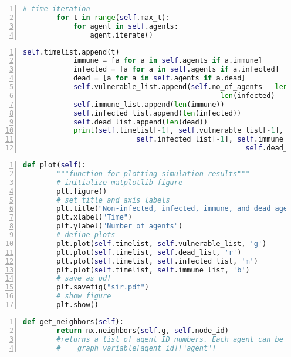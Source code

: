 \documentclass[25pt,a4paper]{article}
\begin{document}
\begin{lstlisting}[language=Python,frame=single,numbers=left,title=Script: Possibility for time iteration (e.g. in a run method of the Simulation class)]
        # time iteration
        for t in range(self.max_t):
            for agent in self.agents:
                agent.iterate()
\end{lstlisting}
\normalsize

\begin{lstlisting}[language=Python,frame=single,numbers=left,title=Script: Possibility for collecting statistics at runtime (requires boolean variables self.immune; self.infected; and self.dead to exist (and be up-to-date) in the Agent class)]
            self.timelist.append(t)
            immune = [a for a in self.agents if a.immune]
            infected = [a for a in self.agents if a.infected]
            dead = [a for a in self.agents if a.dead]
            self.vulnerable_list.append(self.no_of_agents - len(immune) \
                                             - len(infected) - len(dead))
            self.immune_list.append(len(immune))
            self.infected_list.append(len(infected))
            self.dead_list.append(len(dead))
            print(self.timelist[-1], self.vulnerable_list[-1],          \
                           self.infected_list[-1], self.immune_list[-1],\
                                                     self.dead_list[-1],)
\end{lstlisting}
\normalsize

\begin{lstlisting}[language=Python,frame=single,numbers=left,title=Script: Possible plotting method for the Simulation class]
    def plot(self):
        """function for plotting simulation results"""
        # initialize matplotlib figure
        plt.figure()
        # set title and axis labels
        plt.title("Non-infected, infected, immune, and dead agents")
        plt.xlabel("Time")
        plt.ylabel("Number of agents")
        # define plots
        plt.plot(self.timelist, self.vulnerable_list, 'g')
        plt.plot(self.timelist, self.dead_list, 'r')
        plt.plot(self.timelist, self.infected_list, 'm')
        plt.plot(self.timelist, self.immune_list, 'b')
        # save as pdf
        plt.savefig("sir.pdf")
        # show figure
        plt.show()
\end{lstlisting}
\normalsize

\begin{lstlisting}[language=Python,frame=single,numbers=left,title=Script: Possibility for a method for collecting an agent's neighbors' ID numbers for the Agent class]
    def get_neighbors(self):
        return nx.neighbors(self.g, self.node_id)
        #returns a list of agent ID numbers. Each agent can be acessed by:
        #    graph_variable[agent_id]["agent"]
\end{lstlisting}
\normalsize
\end{document}
